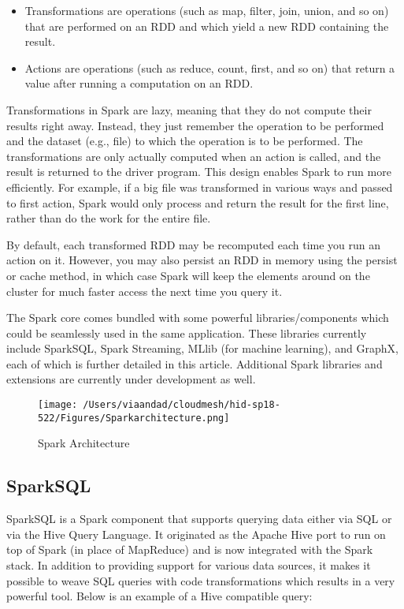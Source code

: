 \documentclass{paper}
\begin{document}
\begin{itemize}
   \item  Transformations are operations (such as map, filter, join, union, and so on) that are performed 		on an RDD and which yield a new RDD containing the result.
   \item  Actions are operations (such as reduce, count, first, and so on) that return a value after running a 		computation on an RDD.
\end{itemize}

Transformations in Spark are lazy, meaning that they do not compute their results right away. Instead, they just remember the operation to be performed and the dataset (e.g., file) to which the operation is to be performed. The transformations are only actually computed when an action is called, and the result is returned to the driver program. This design enables Spark to run more efficiently. For example, if a big file was transformed in various ways and passed to first action, Spark would only process and return the result for the first line, rather than do the work for the entire file.\cite{ref:topal} \hfill\break

By default, each transformed RDD may be recomputed each time you run an action on it. However, you may also persist an RDD in memory using the persist or cache method, in which case Spark will keep the elements around on the cluster for much faster access the next time you query it.\cite{ref:topal}\hfill\break

The Spark core comes bundled with some powerful libraries/components which could be seamlessly used in the same application. These libraries currently include SparkSQL, Spark Streaming, MLlib (for machine learning), and GraphX, each of which is further detailed in this article. Additional Spark libraries and extensions are currently under development as well.\cite{ref:topal}\hfill\break


\begin{figure}[H]
	\centering
	\texttt{[image: /Users/viaandad/cloudmesh/hid-sp18-522/Figures/Sparkarchitecture.png]}
	\caption[Optional caption]{Spark Architecture}
	\label{fig:sparkfeatures}
\end{figure}

\subsection{SparkSQL}
SparkSQL is a Spark component that supports querying data either via SQL or via the Hive Query Language. It originated as the Apache Hive port to run on top of Spark (in place of MapReduce) and is now integrated with the Spark stack. In addition to providing support for various data sources, it makes it possible to weave SQL queries with code transformations which results in a very powerful tool. Below is an example of a Hive compatible query:\cite{ref:topal}\hfill\break
\end{document}
